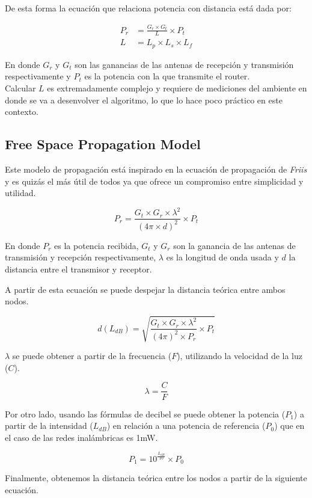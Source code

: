 \documentclass[journal]{IEEEtran}
\begin{document}
De esta forma la ecuación que relaciona potencia con distancia está dada por:

\begin{align*}
P_r &= {\frac {G_r \times G_t} {L}} \times P_t\\
L &= L_p \times L_s \times L_f
\end{align*}

En donde $G_r$ y $G_t$ son las ganancias de las antenas de recepción y transmisión respectivamente y $P_t$ es la potencia con la que transmite el router.\\

Calcular $L$ es extremadamente complejo y requiere de mediciones del ambiente en donde se va a desenvolver el algoritmo, lo que lo hace poco práctico en este contexto.

\subsection{Free Space Propagation Model}

Este modelo de propagación está inspirado en la ecuación de propagación de \emph{Friis} \cite{friis:transmission:equation} y es quizás el más útil de todos ya que ofrece un compromiso entre simplicidad y utilidad.

$$P_r = \frac {G_t \times G_r \times \lambda^2} {(4 \pi \times d)^2} \times P_t$$

En donde $P_r$ es la potencia recibida, $G_t$ y $G_r$ son la ganancia de las antenas de transmisión y recepción respectivamente, $\lambda$ es la longitud de onda usada y $d$ la distancia entre el transmisor y receptor.

A partir de esta ecuación se puede despejar la distancia teórica entre ambos nodos.

$$d(L_{dB}) = \sqrt {\frac {G_t \times G_r \times \lambda^2} {(4 \pi)^2 \times P_r} \times P_t}$$

$\lambda$ se puede obtener a partir de la frecuencia ($F$), utilizando la velocidad de la luz ($C$).

$$\lambda = \frac {C} {F}$$

Por otro lado, usando las fórmulas de decibel se puede obtener la potencia ($P_1$) a partir de la intensidad ($L_{dB}$) en relación a una potencia de referencia ($P_0$) que en el caso de las redes inalámbricas es 1mW.

$$P_1 = 10^{\frac {L_{dB}} {10}} \times P_0$$

Finalmente, obtenemos la distancia teórica entre los nodos a partir de la siguiente ecuación.
\end{document}

